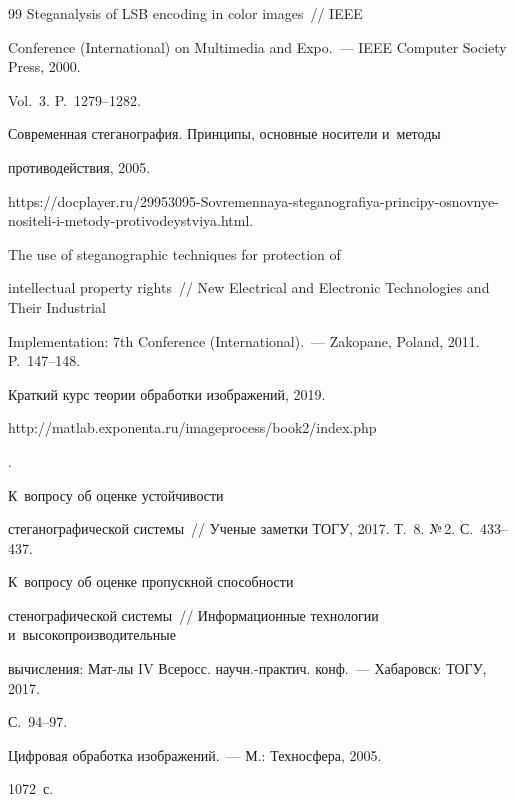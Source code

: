 {{\begin{thebibliography}{99}
 Steganalysis of LSB encoding in color images~/\!\!/ IEEE  


Conference (International) on Multimedia and Expo.~--- IEEE Computer Society Press, 2000. 


Vol.~3. P.~1279--1282.




 Современная стеганография. Принципы, основные носители и~методы 


противодействия, 2005. {\sf  


https://docplayer.ru/29953095-Sovremennaya-steganografiya-principy-osnovnye-nositeli-i-metody-protivodeystviya.html.} 




 The use of steganographic techniques for protection of 


intellectual property rights~/\!\!/ New Electrical and Electronic Technologies and Their Industrial 


Implementation: 7th  Conference (International).~--- Zakopane, Poland, 2011. P.~147--148.




 Краткий курс теории обработки изображений, 2019. {\sf 


http://matlab.exponenta.ru/imageprocess/book2/index.php}.







 К~вопросу об оценке устойчивости 


стеганографической системы~/\!\!/ Ученые заметки ТОГУ, 2017. Т.~8. №\,2. С.~433--437.




 К~вопросу об оценке пропускной способности 


стенографической системы~/\!\!/ Информационные технологии и~высокопроизводительные 


вычисления: Мат-лы IV Всеросс. научн.-практич. конф.~--- Хабаровск: ТОГУ, 2017.  


С.~94--97.







 Цифровая обработка изображений.~--- М.: Техносфера, 2005. 


1072~с.





    \end{thebibliography}


} }








